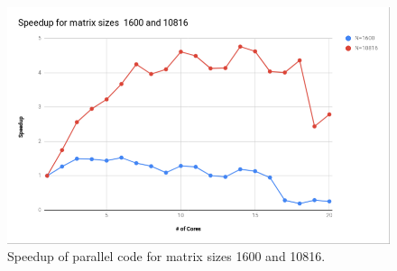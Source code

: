 \documentclass{article}
\begin{document}
\begin{spacing}{1.1}
\begin{center}
	\begin{figure}[H]
	\centering
       \includegraphics[scale=.40]{speedup_pr2.png}
        \caption{\label{Speedup} Speedup of parallel code for matrix sizes 1600 and 10816.} 
	\end{figure}
\end{center}



\end{spacing}
\end{document}
